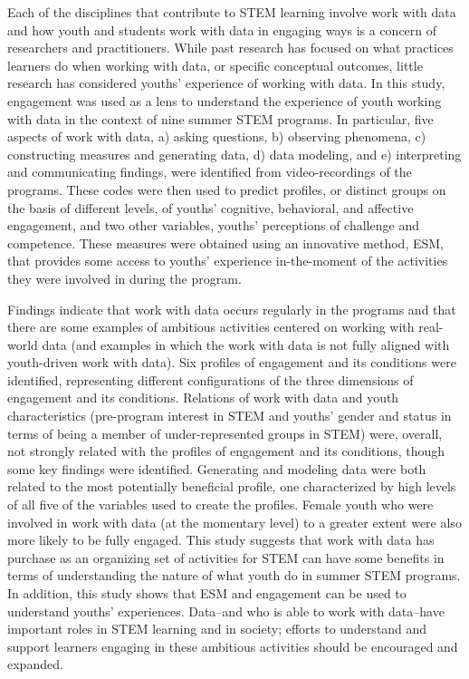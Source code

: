 \documentclass[]{book}
\theoremstyle{definition}
\theoremstyle{definition}
\theoremstyle{definition}
\theoremstyle{remark}
\begin{document}
Each of the disciplines that contribute to STEM learning involve work
with data and how youth and students work with data in engaging ways is
a concern of researchers and practitioners. While past research has
focused on what practices learners do when working with data, or
specific conceptual outcomes, little research has considered youths'
experience of working with data. In this study, engagement was used as a
lens to understand the experience of youth working with data in the
context of nine summer STEM programs. In particular, five aspects of
work with data, a) asking questions, b) observing phenomena, c)
constructing measures and generating data, d) data modeling, and e)
interpreting and communicating findings, were identified from
video-recordings of the programs. These codes were then used to predict
profiles, or distinct groups on the basis of different levels, of
youths' cognitive, behavioral, and affective engagement, and two other
variables, youths' perceptions of challenge and competence. These
measures were obtained using an innovative method, ESM, that provides
some access to youths' experience in-the-moment of the activities they
were involved in during the program.

Findings indicate that work with data occurs regularly in the programs
and that there are some examples of ambitious activities centered on
working with real-world data (and examples in which the work with data
is not fully aligned with youth-driven work with data). Six profiles of
engagement and its conditions were identified, representing different
configurations of the three dimensions of engagement and its conditions.
Relations of work with data and youth characteristics (pre-program
interest in STEM and youths' gender and status in terms of being a
member of under-represented groups in STEM) were, overall, not strongly
related with the profiles of engagement and its conditions, though some
key findings were identified. Generating and modeling data were both
related to the most potentially beneficial profile, one characterized by
high levels of all five of the variables used to create the profiles.
Female youth who were involved in work with data (at the momentary
level) to a greater extent were also more likely to be fully engaged.
This study suggests that work with data has purchase as an organizing
set of activities for STEM can have some benefits in terms of
understanding the nature of what youth do in summer STEM programs. In
addition, this study shows that ESM and engagement can be used to
understand youths' experiences. Data--and who is able to work with
data--have important roles in STEM learning and in society; efforts to
understand and support learners engaging in these ambitious activities
should be encouraged and expanded.
\end{document}
